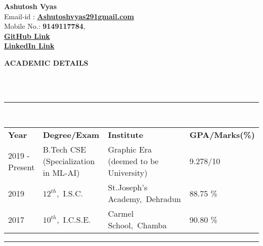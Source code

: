 \documentclass[a4paper,10pt]{article}
\newcommand{\lsep}{-0.5cm}
\newcommand{\resheading}[1]{{\small \colorbox{mygrey}{\begin{minipage}{0.975\textwidth}{\textbf{#1 \vphantom{p\^{E}}}}\end{minipage}}}}
\begin{document}
\textbf{Ashutosh Vyas} \\
\indent Email-id : \textbf{\url{Ashutoshvyas291gmail.com}} \\
\indent Mobile No.: \textbf{9149117784}, \ \\
\indent \href{http://github.com/Ash20vyas}{\textbf{GitHub Link}}\\
\indent \href{https://www.linkedin.com/in/ashutoshvyas291}{\textbf{LinkedIn Link}}\\

\resheading{\textbf{ACADEMIC DETAILS} }\\[\lsep]
\\
\indent \rule{6.94in}{0.4pt}\\
\indent \begin{tabular}{ l @{\hskip 0.15in} l @{\hskip 0.15in} l @{\hskip 0.15in} l @{\hskip 0.15in} }
\noindent \textbf{Year} & \textbf{Degree/Exam} & \textbf{Institute} & \textbf{GPA/Marks(\%)}\\
2019 - Present & B.Tech CSE (Specialization in ML-AI) & Graphic Era (deemed to be University) & 9.278/10 \\
2019 & $12^{th}$,\ I.S.C. & St.Joseph's Academy,\ Dehradun & 88.75 \% \\
2017 & $10^{th}$,\ I.C.S.E. & Carmel School,\ Chamba & 90.80 \%\\

\end{tabular}
\indent \rule{6.94in}{0.4pt}
\\
\end{document}
